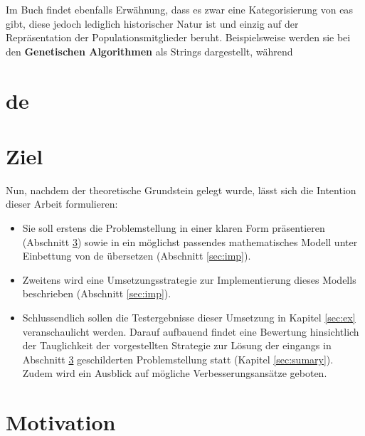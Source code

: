 		Im Buch \cite{eib-smi-ea} findet ebenfalls Erwähnung, dass es zwar eine Kategorisierung von \gls{ea}s gibt, diese jedoch lediglich historischer Natur ist und einzig auf der Repräsentation der Populationsmitglieder beruht. Beispielsweise werden sie bei den \textbf{Genetischen Algorithmen} als Strings dargestellt, während
		
	
	
	\section{\gls{de}}
	\label{sec:de}
	
	\section{Ziel}
	\label{sec:ziel}
	
		Nun, nachdem der theoretische Grundstein gelegt wurde, lässt sich die Intention dieser Arbeit formulieren:
		\begin{itemize}
			\item Sie soll erstens die Problemstellung in einer klaren Form präsentieren (Abschnitt \ref{sec:motivation}) sowie in ein möglichst passendes mathematisches Modell unter Einbettung von \gls{de} übersetzen (Abschnitt \ref{sec:imp}).
			\item Zweitens wird eine Umsetzungsstrategie zur Implementierung dieses Modells beschrieben (Abschnitt \ref{sec:imp}).
			\item Schlussendlich sollen die Testergebnisse dieser Umsetzung in Kapitel \ref{sec:ex} veranschaulicht werden. Darauf aufbauend findet eine Bewertung hinsichtlich der Tauglichkeit der vorgestellten Strategie zur Lösung der eingangs in Abschnitt \ref{sec:motivation} geschilderten Problemstellung statt (Kapitel \ref{sec:sumary}). Zudem wird ein Ausblick auf mögliche Verbesserungsansätze geboten. 
		\end{itemize}
	
	\section{Motivation}
	\label{sec:motivation}